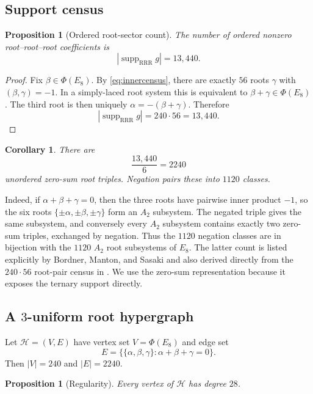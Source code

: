 \documentclass[11pt]{article}
\newtheorem{proposition}[theorem]{Proposition}
\newtheorem{corollary}[theorem]{Corollary}
\theoremstyle{definition}
\theoremstyle{remark}
\newcommand{\PhiE}{\Phi(E_8)}
\newcommand{\supp}{\operatorname{supp}}
\newcommand{\RRR}{\mathrm{RRR}}
\begin{document}
\subsection{Support census}

\begin{proposition}[Ordered root-sector count]\label{prop:rrrcount}
The number of ordered nonzero root--root--root coefficients is
\[
|\supp_{\RRR} g|=13{,}440.
\]
\end{proposition}

\begin{proof}
Fix $\beta\in\PhiE$.  By \eqref{eq:innercensus}, there are exactly $56$ roots $\gamma$ with $(\beta,\gamma)=-1$.  In a simply-laced root system this is equivalent to $\beta+\gamma\in\PhiE$.  The third root is then uniquely $\alpha=-(\beta+\gamma)$.  Therefore
\[
|\supp_{\RRR} g|=240\cdot56=13{,}440.
\]
\end{proof}

\begin{corollary}\label{cor:2240}
There are
\[
\frac{13{,}440}{6}=2240
\]
unordered zero-sum root triples.  Negation pairs these into $1120$ classes.
\end{corollary}

Indeed, if $\alpha+\beta+\gamma=0$, then the three roots have pairwise inner product $-1$, so the six roots $\{\pm\alpha,\pm\beta,\pm\gamma\}$ form an $A_2$ subsystem.  The negated triple gives the same subsystem, and conversely every $A_2$ subsystem contains exactly two zero-sum triples, exchanged by negation.  Thus the $1120$ negation classes are in bijection with the $1120$ $A_2$ root subsystems of $E_8$.  The latter count is listed explicitly by Bordner, Manton, and Sasaki \cite{BordnerMantonSasaki2000} and also derived directly from the $240\cdot56$ root-pair census in \cite{BohningBothmerMarquand2026}.  We use the zero-sum representation because it exposes the ternary support directly.

\subsection{A \texorpdfstring{$3$}{3}-uniform root hypergraph}

Let $\mathcal H=(V,E)$ have vertex set $V=\PhiE$ and edge set
\[
E=\bigl\{\{\alpha,\beta,\gamma\}:\alpha+\beta+\gamma=0\bigr\}.
\]
Then $|V|=240$ and $|E|=2240$.

\begin{proposition}[Regularity]\label{prop:degree28}
Every vertex of $\mathcal H$ has degree $28$.
\end{proposition}
\end{document}
